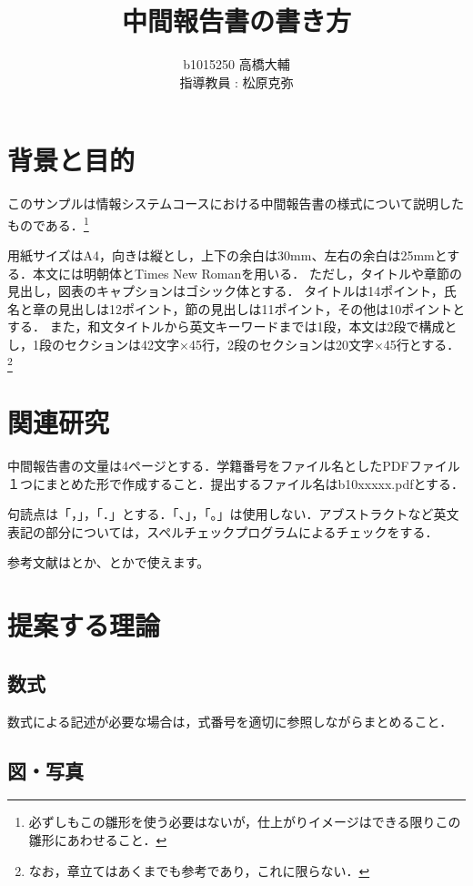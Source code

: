 \documentclass[11pt,a4paper,draft]{jarticle}
\title{中間報告書の書き方}
\author{b1015250 高橋大輔\\指導教員 : 松原克弥}
\begin{document}
\maketitle

\section{背景と目的}

このサンプルは情報システムコースにおける中間報告書の様式について説明したものである．\footnote{必ずしもこの雛形を使う必要はないが，仕上がりイメージはできる限りこの雛形にあわせること．}

用紙サイズはA4，向きは縦とし，上下の余白は30mm、左右の余白は25mmとする．本文には明朝体とTimes New Romanを用いる．
ただし，タイトルや章節の見出し，図表のキャプションはゴシック体とする．
タイトルは14ポイント，氏名と章の見出しは12ポイント，節の見出しは11ポイント，その他は10ポイントとする．
また，和文タイトルから英文キーワードまでは1段，本文は2段で構成とし，1段のセクションは42文字×45行，2段のセクションは20文字×45行とする．
\footnote{なお，章立てはあくまでも参考であり，これに限らない．}

\section{関連研究}

中間報告書の文量は4ページとする．学籍番号をファイル名としたPDFファイル１つにまとめた形で作成すること．提出するファイル名はb10xxxxx.pdfとする．

句読点は「，」，「．」とする．「、」，「。」は使用しない．アブストラクトなど英文表記の部分については，スペルチェックプログラムによるチェックをする．

参考文献は\cite{netflix-2016}とか、\cite{lewis-2014}とかで使えます。

\section{提案する理論}

\subsection{数式}

数式による記述が必要な場合は，式番号を適切に参照しながらまとめること．

\subsection{図・写真}
\end{document}
